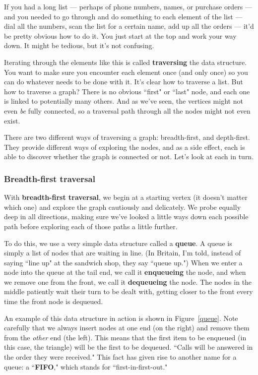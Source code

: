 If you had a long list --- perhaps of phone numbers, names, or purchase
orders --- and you needed to go through and do something to each element of
the list --- dial all the numbers, scan the list for a certain name, add up
all the orders --- it'd be pretty obvious how to do it. You just start at
the top and work your way down. It might be tedious, but it's not
confusing.

Iterating through the elements like this is called \textbf{traversing} the
data structure. You want to make sure you encounter each element once (and
only once) so you can do whatever needs to be done with it. It's clear how
to traverse a list. But how to traverse a graph? There is no obvious
``first" or ``last" node, and each one is linked to potentially many
others. And as we've seen, the vertices might not even \textit{be} fully
connected, so a traversal path through all the nodes might not even exist.

There are two different ways of traversing a graph: breadth-first, and
depth-first. They provide different ways of exploring the nodes, and as a
side effect, each is able to discover whether the graph is connected or
not. Let's look at each in turn.

\subsubsection{Breadth-first traversal}

With \textbf{breadth-first traversal}, we begin at a starting vertex (it
doesn't matter which one) and explore the graph cautiously and delicately.
We probe equally deep in all directions, making sure we've looked a little
ways down each possible path before exploring each of those paths a little
further.

To do this, we use a very simple data structure called a \textbf{queue}. A
queue is simply a list of nodes that are waiting in line. (In Britain, I'm
told, instead of saying ``line up" at the sandwich shop, they say ``queue
up.") When we enter a node into the queue at the tail end, we call it
\textbf{enqueueing} the node, and when we remove one from the front, we
call it \textbf{dequeueing} the node. The nodes in the middle patiently
wait their turn to be dealt with, getting closer to the front every time
the front node is dequeued. 

An example of this data structure in action is shown in Figure~\ref{queue}.
Note carefully that we always insert nodes at one end (on the right) and
remove them from the \textit{other} end (the left). This means that the
first item to be enqueued (in this case, the triangle) will be the first to
be dequeued. ``Calls will be answered in the order they were received."
This fact has given rise to another name for a queue: a ``\textbf{FIFO},"
which stands for ``first-in-first-out."

